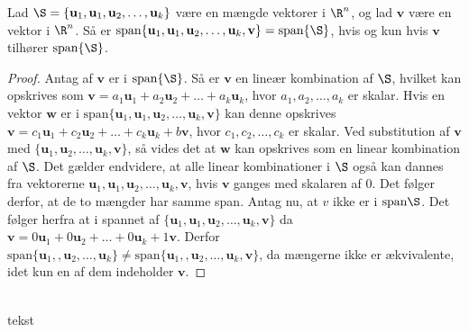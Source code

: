 \begin{thm}{}{}
%
Lad $\S =  \{\mathbf{u}_1,\mathbf{u}_1, \mathbf{u}_2 , \ldots , \mathbf{u}_k \}$ være en mængde vektorer i $\R^n$, og lad $\mathbf{v}$ være en vektor i $\R^n$.
Så er $\text{span}\{ \mathbf{u}_1,\mathbf{u}_1, \mathbf{u}_2 , \ldots , \mathbf{u}_k , \mathbf{v}\} =\text{span}\{\S\}$, hvis og kun hvis $\mathbf{v}$ tilhører $\text{span}\{\S\}$.
%
\end{thm}
%
%
\begin{proof}
%
Antag af $\mathbf{v}$ er i $\text{span}\{\S\}$. Så er $\mathbf{v}$ en lineær kombination af $\S$, hvilket kan opskrives som $\mathbf{v}=a_1\mathbf{u}_1+a_2\mathbf{u}_2+ \ldots + a_k\mathbf{u}_k$, hvor $a_1,a_2,\ldots, a_k$ er skalar. 
Hvis en vektor $\mathbf{w}$ er i $\text{span}\{ \mathbf{u}_1,\mathbf{u}_1, \mathbf{u}_2 , \ldots , \mathbf{u}_k , \mathbf{v}\}$ kan denne opskrives $\mathbf{v}=c_1\mathbf{u}_1+c_2\mathbf{u}_2+ \ldots + c_k\mathbf{u}_k+b\mathbf{v}$, hvor $c_1,c_2,\ldots, c_k$ er skalar.
Ved substitution af $\mathbf{v}$ med $\{ \mathbf{u}_1, \mathbf{u}_2 , \ldots , \mathbf{u}_k , \mathbf{v}\}$, så vides det at $\mathbf{w}$ kan opskrives som en linear kombination af $\S$. 
Det gælder endvidere, at alle linear kombinationer i $\S$ også kan dannes fra vektorerne $\mathbf{u}_1,\mathbf{u}_1, \mathbf{u}_2 , \ldots , \mathbf{u}_k , \mathbf{v}$, hvis $\mathbf{v}$ ganges med skalaren af $0$.
Det følger derfor, at de to mængder har samme span. 
Antag nu, at $v$ ikke er i $\text{span}\S$. 
Det følger herfra at i spannet af 
$\{ \mathbf{u}_1,\mathbf{u}_1, \mathbf{u}_2 , \ldots , \mathbf{u}_k , \mathbf{v}\}$ da 
$\mathbf{v}=0\mathbf{u}_1+0\mathbf{u}_2+ \ldots + 0\mathbf{u}_k+1\mathbf{v}$.
Derfor 
$\text{span}\{ \mathbf{u}_1,, \mathbf{u}_2 , \ldots , \mathbf{u}_k \}
\neq
\text{span}\{ \mathbf{u}_1,, \mathbf{u}_2 , \ldots , \mathbf{u}_k , \mathbf{v}\}$, 
da mængerne ikke er ækvivalente, idet kun en af dem indeholder $\mathbf{v}$. 
%
\end{proof}
\\
%
tekst 
%
































